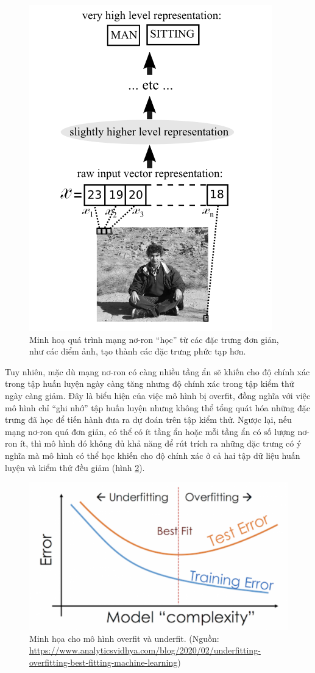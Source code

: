 \begin{figure}[htp]
	\centering
	\includegraphics[width=65 mm]{images/layers-features.png}
	\caption{Minh hoạ quá trình mạng nơ-ron ``học'' từ các đặc trưng đơn giản, như các điểm ảnh, tạo thành các đặc trưng phức tạp hơn.\cite{bengio2009learning}}
	\label{fig:layers-features}
\end{figure}

Tuy nhiên, mặc dù mạng nơ-ron có càng nhiều tầng ẩn sẽ khiến cho độ chính xác trong tập huấn luyện ngày càng tăng nhưng độ chính xác trong tập kiểm thử ngày càng giảm. Đây là biểu hiện của việc mô hình bị overfit, đồng nghĩa với việc mô hình chỉ ``ghi nhớ'' tập huấn luyện nhưng không thể tổng quát hóa những đặc trưng đã học để tiến hành đưa ra dự đoán trên tập kiểm thử. Ngược lại, nếu mạng nơ-ron quá đơn giản, có thể có ít tầng ẩn hoặc mỗi tầng ẩn có số lượng nơ-ron ít, thì mô hình đó không đủ khả năng để rút trích ra những đặc trưng có ý nghĩa mà mô hình có thể học khiến cho độ chính xác ở cả hai tập dữ liệu huấn luyện và kiểm thử đều giảm (hình \ref{fig:under-over}).

\begin{figure}[htp]
	\centering
	\includegraphics[width=100 mm]{images/under-over.png}
	\caption{Minh họa cho mô hình overfit và underfit. (Nguồn: \url{https://www.analyticsvidhya.com/blog/2020/02/underfitting-overfitting-best-fitting-machine-learning})}
	\label{fig:under-over}
\end{figure}

